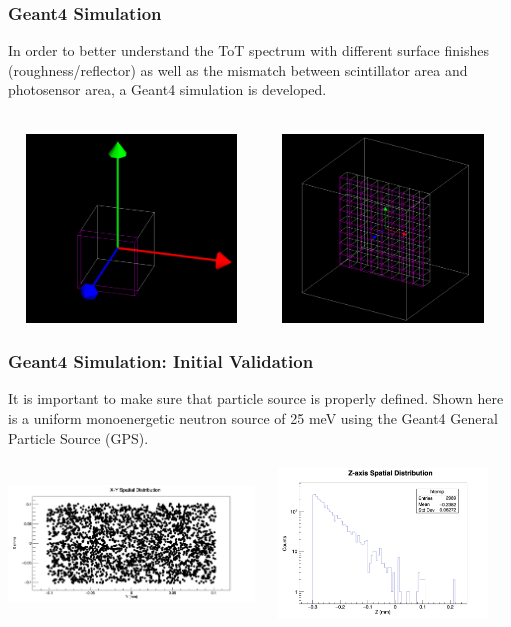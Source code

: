 \documentclass[xcolor=x11names, compress, handout]{beamer}
\renewcommand{\(}{\begin{columns}}
\renewcommand{\)}{\end{columns}}
\newcommand{\<}[1]{\begin{column}{#1}}
\renewcommand{\>}{\end{column}}
\begin{document}
\begin{frame}[c]
\frametitle{Geant4 Simulation}
In order to better understand the ToT spectrum with different surface finishes (roughness/reflector) as well as the mismatch between scintillator area and photosensor area, a Geant4 simulation is developed. \\
  \

  \includegraphics[width=0.49\textwidth, height=5cm]{images/singlepixel.png}
  \includegraphics[width=0.49\textwidth, height=5cm]{images/pixelarray.png}
\end{frame}

\begin{frame}
  \frametitle{Geant4 Simulation: Initial Validation }

  It is important to make sure that particle source is properly defined. Shown here is a uniform monoenergetic neutron source of 25 meV using the Geant4 General Particle Source (GPS). \\
  \ \\

  \centering
  \includegraphics[width=0.49\textwidth,height=4cm]{images/xy_spatial_distribution.png}
  \includegraphics[width=0.49\textwidth,height=4cm]{images/z_spatial_distribution.png}

\end{frame}
\end{document}
